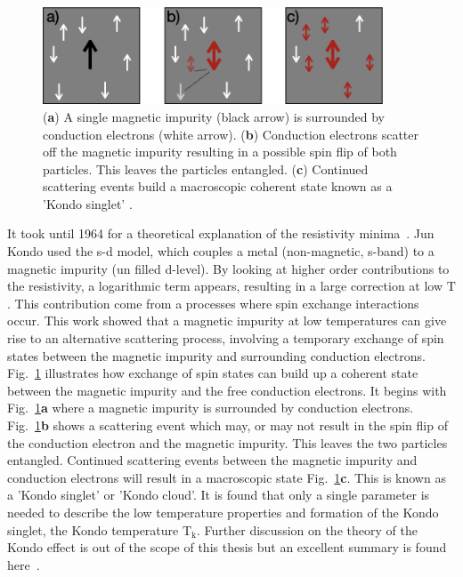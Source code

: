 \begin{figure}[!hbt]
  \begin{center}
    \includegraphics[width=0.9\textwidth]{figures/ch2/crop_FiguresMaster.009.png}
    \caption[Kondo effect illustration]{\label{fig:ch2/kondo_bulkdiagram} 
    (\textbf{a}) A single magnetic impurity (black arrow) is surrounded by conduction electrons (white arrow). (\textbf{b}) Conduction electrons scatter off the magnetic impurity resulting in a possible spin flip of both particles. This leaves the particles entangled. (\textbf{c}) Continued scattering events build a macroscopic coherent state known as a 'Kondo singlet' .
      }
  \end{center}
\end{figure}


It took until 1964 for a theoretical explanation of the resistivity minima~\cite{jun_kondo}. Jun Kondo used the s-d model, which couples a metal (non-magnetic, s-band) to a magnetic impurity (un filled d-level). By looking at higher order contributions to the resistivity, a logarithmic term appears, resulting in a large correction at low $\mathrm{T}$. This contribution come from a processes where spin exchange interactions occur. This work showed that a magnetic impurity at low temperatures can give rise to an alternative scattering process, involving a temporary exchange of spin states between the magnetic impurity and surrounding conduction electrons. Fig.~\ref{fig:ch2/kondo_bulkdiagram} illustrates how exchange of spin states can build up a coherent state between the magnetic impurity and the free conduction electrons. It begins with Fig.~\ref{fig:ch2/kondo_bulkdiagram}\textbf{a} where a magnetic impurity is surrounded by conduction electrons. 
Fig.~\ref{fig:ch2/kondo_bulkdiagram}\textbf{b} shows a scattering event which may, or may not result in the spin flip of the conduction electron and the magnetic impurity. This leaves the two particles entangled. Continued scattering events between the magnetic impurity and conduction electrons will result in a macroscopic state Fig.~\ref{fig:ch2/kondo_bulkdiagram}\textbf{c}. This is known as a 'Kondo singlet' or 'Kondo cloud'. It is found that only a single parameter is needed to describe the low temperature properties and formation of the Kondo singlet, the Kondo temperature $\mathrm{T_k}$. Further discussion on the theory of the Kondo effect is out of the scope of this thesis but an excellent summary is found here~\cite{kondo_theory_history}. 




